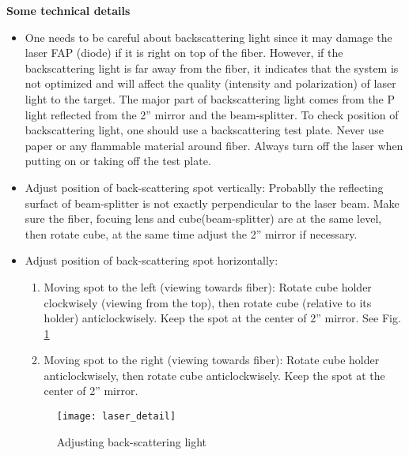 {\medskip
\noindent
{\bf{Some technical details}}
\begin{itemize}
\item One needs to be careful about backscattering light since it may
damage the laser FAP (diode) if it is right on top of the fiber.
However, if the backscattering light is far away from the fiber, it
indicates that the system is not optimized and will affect the quality
(intensity and polarization) of laser light to the target.  The major
part of backscattering light comes from the P light reflected from the
2'' mirror and the beam-splitter. To check position of backscattering 
light, one should use a backscattering
test plate.  Never use paper or any flammable material around fiber.
Always turn off the laser when putting on or taking off the test plate.

\item Adjust position of back-scattering spot vertically: 
Probablly the reflecting surfact of beam-splitter is not exactly
perpendicular to the laser beam.  Make sure the fiber, focuing lens
and cube(beam-splitter) are at the same level, then rotate cube, at
the same time adjust the 2'' mirror if necessary.

\item Adjust position of back-scattering spot horizontally:
\begin{enumerate}
\item Moving spot to the left (viewing towards fiber): Rotate cube
holder clockwisely (viewing from the top), then rotate cube (relative
to its holder) anticlockwisely.  Keep the spot at the center of 2''
mirror.  See Fig. \ref{fig:laser_detail}

\item Moving spot to the right (viewing towards fiber): Rotate cube
holder anticlockwisely, then rotate cube anticlockwisely.  Keep the 
spot at the center of 2'' mirror.
\end{enumerate}

\begin{figure}
\begin{center}
\centerline{\texttt{[image: laser\_detail]}}
\end{center}
\caption{Adjusting back-scattering light}
\label{fig:laser_detail}
\end{figure}

\end{itemize}


}
